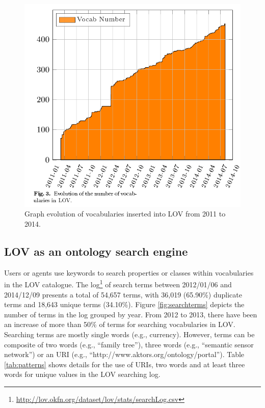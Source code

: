 \documentclass{iosart2c}
\begin{document}
\begin{figure}[h!tb]
\centering
  \includegraphics[width=\linewidth]{LOVEvol.png}
  \caption{Graph evolution of vocabularies inserted into LOV from 2011 to 2014.}
  \label{fig:translations}
\end{figure}

\subsection{LOV as an ontology search engine}
\label{sec:ontoSearch}
Users or agents use keywords to search properties or classes within vocabularies in the LOV catalogue. The log\footnote{\url{http://lov.okfn.org/dataset/lov/stats/searchLog.csv}} of search terms between 2012/01/06 and 2014/12/09 presents a total of 54,657 terms, with 36,019 (65.90\%) duplicate terms and 18,643 unique terms (34.10\%). Figure \ref{fig:searchterms} depicts the number of terms in the log grouped by year. From 2012 to 2013, there have been an increase of more than 50\% of terms for searching vocabularies in LOV. Searching terms are mostly single words (e.g., currency). However, terms can be composite of two words (e.g., ``family tree''), three words (e.g., ``semantic sensor network'') or an URI (e.g., ``http://www.aktors.org/ontology/portal''). Table \ref{tab:patterns} shows details for the use of URIs, two words and at least three words for unique values in the LOV searching log.
\end{document}
